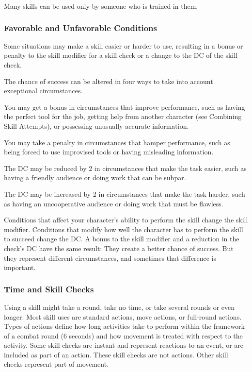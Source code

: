 Many skills can be used only by someone who is trained in them.

\subsubsection{Favorable and Unfavorable Conditions}
Some situations may make a skill easier or harder to use, resulting in a bonus or penalty to the skill modifier for a skill check or a change to the DC of the skill check.

The chance of success can be altered in four ways to take into account exceptional circumstances.
\begin{enumerate*}
\item You may get a  bonus in circumstances that improve performance, such as having the perfect tool for the job, getting help from another character (see Combining Skill Attempts), or possessing unusually accurate information.
\item You may take a  penalty in circumstances that hamper performance, such as being forced to use improvised tools or having misleading information.
\item The DC may be reduced by 2 in circumstances that make the task easier, such as having a friendly audience or doing work that can be subpar.
\item  The DC may be increased by 2 in circumstances that make the task harder, such as having an uncooperative audience or doing work that must be flawless.
\end{enumerate*}

Conditions that affect your character's ability to perform the skill change the skill modifier. Conditions that modify how well the character has to perform the skill to succeed change the DC. A bonus to the skill modifier and a reduction in the check's DC have the same result: They create a better chance of success. But they represent different circumstances, and sometimes that difference is important.

\subsubsection{Time and Skill Checks}
Using a skill might take a round, take no time, or take several rounds or even longer. Most skill uses are standard actions, move actions, or full-round actions. Types of actions define how long activities take to perform within the framework of a combat round (6 seconds) and how movement is treated with respect to the activity. Some skill checks are instant and represent reactions to an event, or are included as part of an action. These skill checks are not actions. Other skill checks represent part of movement.


